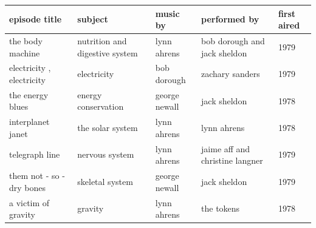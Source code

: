 \documentclass{article}
\begin{document}
\begin{tabular}{lllll}
\toprule
episode title & subject & music by & performed by & first aired \\
\midrule
the body machine & nutrition and digestive system & lynn ahrens & bob dorough and jack sheldon & 1979 \\
electricity , electricity & electricity & bob dorough & zachary sanders & 1979 \\
the energy blues & energy conservation & george newall & jack sheldon & 1978 \\
interplanet janet & the solar system & lynn ahrens & lynn ahrens & 1978 \\
telegraph line & nervous system & lynn ahrens & jaime aff and christine langner & 1979 \\
them not - so - dry bones & skeletal system & george newall & jack sheldon & 1979 \\
a victim of gravity & gravity & lynn ahrens & the tokens & 1978 \\
\bottomrule
\end{tabular}
\end{document}
